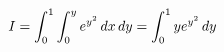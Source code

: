 \documentclass[preview]{standalone}
\begin{document}
\begin{align*}
\special{dvisvgm:raw <g id='unique000'>}I=\int_0^1\int_0^y e^{y^2}\,dx\,dy=\int_0^1 y e^{y^2}\,dy\special{dvisvgm:raw </g>}
\end{align*}
\end{document}
